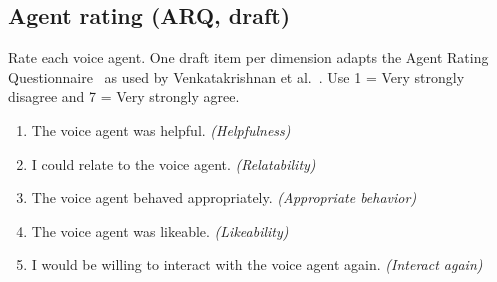 \subsection{Agent rating (ARQ, draft)}
Rate each voice agent. One draft item per dimension adapts the Agent Rating Questionnaire~\cite{wang2020terrible} as used by Venkatakrishnan et al.~\cite{venkatakrishnan2026clarifying}. Use 1 = Very strongly disagree and 7 = Very strongly agree.
\begin{enumerate}[labelwidth=3.2em,leftmargin=3.6em]
\item[ARQ1.] \begin{minipage}[t]{\linewidth}
The voice agent was helpful. \textit{(Helpfulness)}
\end{minipage}
\item[ARQ2.] \begin{minipage}[t]{\linewidth}
I could relate to the voice agent. \textit{(Relatability)}
\end{minipage}
\item[ARQ3.] \begin{minipage}[t]{\linewidth}
The voice agent behaved appropriately. \textit{(Appropriate behavior)}
\end{minipage}
\item[ARQ4.] \begin{minipage}[t]{\linewidth}
The voice agent was likeable. \textit{(Likeability)}
\end{minipage}
\item[ARQ5.] \begin{minipage}[t]{\linewidth}
I would be willing to interact with the voice agent again. \textit{(Interact again)}
\end{minipage}
\end{enumerate}
